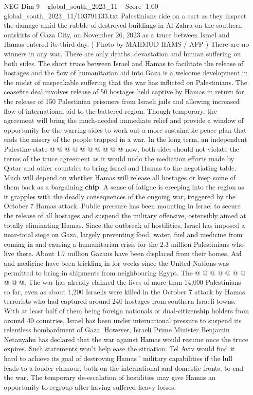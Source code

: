 \begin{textsample}{NEG Dim 9 – global\_south\_2023\_11 – Score -1.00 – global\_south\_2023\_11/103791133.txt}  \label{ex:f9_neg_433}
Palestinians ride on a cart as they inspect the damage amid the rubble of destroyed buildings in Al-Zahra on the southern outskirts of Gaza City, on November 26, 2023 as a truce between Israel and Hamas entered its third day. ( Photo by MAHMUD HAMS / AFP ) There are no winners in any war.
There are only deaths, devastation and human suffering on both sides.
The short truce between Israel and Hamas to facilitate the release of hostages and the flow of humanitarian aid into Gaza is a welcome development in the midst of unspeakable suffering that the war has inflicted on Palestinians.
The ceasefire deal involves release of 50 hostages held captive by Hamas in return for the release of 150 Palestinian prisoners from Israeli jails and allowing increased flow of international aid to the battered region.
Though temporary, the agreement will bring the much-needed immediate relief and provide a window of opportunity for the warring sides to work out a more sustainable peace plan that ends the misery of the people trapped in a war.
In the long term, an independent Palestine state @ @ @ @ @ @ @ @ @ @ now, both sides should not violate the terms of the truce agreement as it would undo the mediation efforts made by Qatar and other countries to bring Israel and Hamas to the negotiating table.
Much will depend on whether Hamas will release all hostages or keep some of them back as a bargaining \textbf{chip}.
A sense of fatigue is creeping into the region as it grapples with the deadly consequences of the ongoing war, triggered by the October 7 Hamas attack.
Public pressure has been mounting in Israel to secure the release of all hostages and suspend the military offensive, ostensibly aimed at totally eliminating Hamas.
Since the outbreak of hostilities, Israel has imposed a near-total siege on Gaza, largely preventing food, water, fuel and medicine from coming in and causing a humanitarian crisis for the 2.3 million Palestinians who live there.
About 1.7 million Gazans have been displaced from their homes.
Aid and medicine have been trickling in for weeks since the United Nations was permitted to bring in shipments from neighbouring Egypt.
The @ @ @ @ @ @ @ @ @ @.
The war has already claimed the lives of more than 14,000 Palestinians so far, even as about 1,200 Israelis were killed in the October 7 attack by Hamas terrorists who had captured around 240 hostages from southern Israeli towns.
With at least half of them being foreign nationals or dual-citizenship holders from around 40 countries, Israel has been under international pressure to suspend its relentless bombardment of Gaza.
However, Israeli Prime Minister Benjamin Netanyahu has declared that the war against Hamas would resume once the truce expires.
Such statements won't help ease the situation.
Tel Aviv would find it hard to achieve its goal of destroying Hamas ' military capabilities if the lull leads to a louder clamour, both on the international and domestic fronts, to end the war.
The temporary de-escalation of hostilities may give Hamas an opportunity to regroup after having suffered heavy losses.

\end{textsample}
